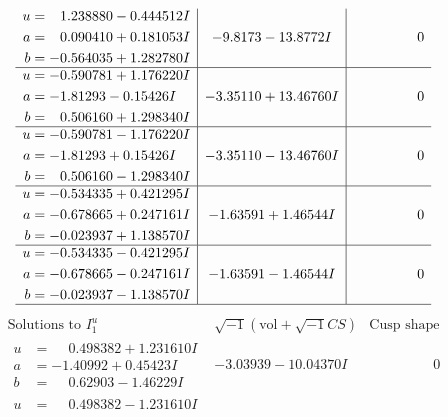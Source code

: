 \documentclass[1p]{elsarticle_modified}
\theoremstyle{definition}
\newcommand{\I}{\sqrt{-1}}
\begin{document}
$$\begin{array}{c|c|c}
\begin{aligned}
u &= \phantom{-}1.238880 - 0.444512 I \\
a &= \phantom{-}0.090410 + 0.181053 I \\
b &= -0.564035 + 1.282780 I\end{aligned}
 & -9.8173 - 13.8772 I & \phantom{-0.000000 } 0 \\ \hline\begin{aligned}
u &= -0.590781 + 1.176220 I \\
a &= -1.81293 - 0.15426 I \\
b &= \phantom{-}0.506160 + 1.298340 I\end{aligned}
 & -3.35110 + 13.46760 I & \phantom{-0.000000 } 0 \\ \hline\begin{aligned}
u &= -0.590781 - 1.176220 I \\
a &= -1.81293 + 0.15426 I \\
b &= \phantom{-}0.506160 - 1.298340 I\end{aligned}
 & -3.35110 - 13.46760 I & \phantom{-0.000000 } 0 \\ \hline\begin{aligned}
u &= -0.534335 + 0.421295 I \\
a &= -0.678665 + 0.247161 I \\
b &= -0.023937 + 1.138570 I\end{aligned}
 & -1.63591 + 1.46544 I & \phantom{-0.000000 } 0 \\ \hline\begin{aligned}
u &= -0.534335 - 0.421295 I \\
a &= -0.678665 - 0.247161 I \\
b &= -0.023937 - 1.138570 I\end{aligned}
 & -1.63591 - 1.46544 I & \phantom{-0.000000 } 0\\
 \hline 
 \end{array}$$\newpage$$\begin{array}{c|c|c}  
\text{Solutions to }I^u_{1}& \I (\text{vol} + \sqrt{-1}CS) & \text{Cusp shape}\\
 \hline 
\begin{aligned}
u &= \phantom{-}0.498382 + 1.231610 I \\
a &= -1.40992 + 0.45423 I \\
b &= \phantom{-}0.62903 - 1.46229 I\end{aligned}
 & -3.03939 - 10.04370 I & \phantom{-0.000000 } 0 \\ \hline\begin{aligned}
u &= \phantom{-}0.498382 - 1.231610 I \\

\end{aligned}
\end{array}$$
\end{document}
